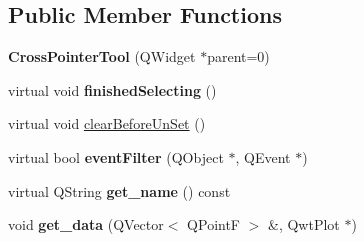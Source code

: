 \subsection*{Public Member Functions}
\begin{DoxyCompactItemize}
\item 
\mbox{\label{classCrossPointerTool_a5e59e97c427f36aa0d2554c1da37eccf}} 
{\bfseries Cross\+Pointer\+Tool} (Q\+Widget $\ast$parent=0)
\item 
\mbox{\label{classCrossPointerTool_ae2aadb3d5553c34805c9ec6f7f4fc854}} 
virtual void {\bfseries finished\+Selecting} ()
\item 
virtual void \mbox{\hyperlink{classCrossPointerTool_a99e1b8f0669837dc5524c446e3dd401c}{clear\+Before\+Un\+Set}} ()
\item 
\mbox{\label{classTool_a020bd5757a03ea7321848a3874f3a8cb}} 
virtual bool {\bfseries event\+Filter} (Q\+Object $\ast$, Q\+Event $\ast$)
\item 
\mbox{\label{classTool_aa30c64915020a71d0ea8650e8e966336}} 
virtual Q\+String {\bfseries get\+\_\+name} () const
\item 
\mbox{\label{classTool_a507adfcdafc818d9628b952001b93f3c}} 
void {\bfseries get\+\_\+data} (Q\+Vector$<$ Q\+PointF $>$ \&, Qwt\+Plot $\ast$)
\end{DoxyCompactItemize}
